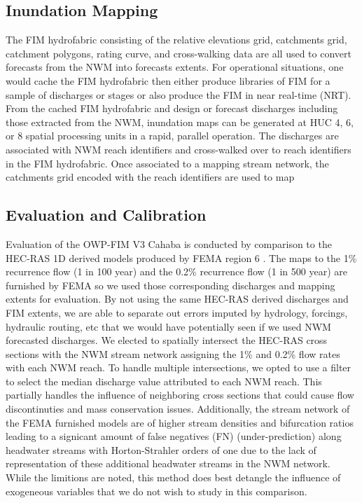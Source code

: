 \subsection{Inundation Mapping}
\label{ssec:inundation_mapping}
%
The FIM hydrofabric consisting of the relative elevations grid, catchments grid, catchment polygons, rating curve, and cross-walking data are all used to convert forecasts from the NWM into forecasts extents.
For operational situations, one would cache the FIM hydrofabric then either produce libraries of FIM for a sample of discharges or stages or also produce the FIM in near real-time (NRT).
From the cached FIM hydrofabric and design or forecast discharges including those extracted from the NWM, inundation maps can be generated at HUC 4, 6, or 8 spatial processing units in a rapid, parallel operation. 
The discharges are associated with NWM reach identifiers and cross-walked over to reach identifiers in the FIM hydrofabric.
Once associated to a mapping stream network, 
the catchments grid encoded with the reach identifiers are used to map
%
\subsection{Evaluation and Calibration}
\label{ssec:evaluation_and_calibration}
%
Evaluation of the OWP-FIM V3 Cahaba is conducted by comparison to the HEC-RAS 1D derived models produced by FEMA region 6 \cite{fema2021base,fema2021estimated}.
The maps to the 1\% recurrence flow (1 in 100 year) and the 0.2\% recurrence flow (1 in 500 year) are furnished by FEMA so we used those corresponding discharges and mapping extents for evaluation.
By not using the same HEC-RAS derived discharges and FIM extents, we are able to separate out errors imputed by hydrology, forcings, hydraulic routing, etc that we would have potentially seen if we used NWM forecasted discharges.
We elected to spatially intersect the HEC-RAS cross sections with the NWM stream network assigning the 1\% and 0.2\% flow rates with each NWM reach. 
To handle multiple intersections, we opted to use a filter to select the median discharge value attributed to each NWM reach.
This partially handles the influence of neighboring cross sections that could cause flow discontinuties and mass conservation issues.
Additionally, the stream network of the FEMA furnished models are of higher stream densities and bifurcation ratios leading to a signicant amount of false negatives (FN) (under-prediction) along headwater streams with Horton-Strahler orders of one due to the lack of representation of these additional headwater streams in the NWM network.
While the limitions are noted, this method does best detangle the influence of exogeneous variables that we do not wish to study in this comparison.

